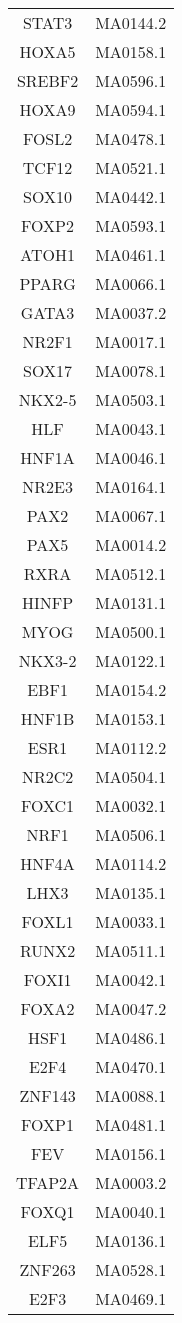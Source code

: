 \begin{supertabular}{cc}
STAT3 & MA0144.2\\
HOXA5 & MA0158.1\\
SREBF2 & MA0596.1\\
HOXA9 & MA0594.1\\
FOSL2 & MA0478.1\\
TCF12 & MA0521.1\\
SOX10 & MA0442.1\\
FOXP2 & MA0593.1\\
ATOH1 & MA0461.1\\
PPARG & MA0066.1\\
GATA3 & MA0037.2\\
NR2F1 & MA0017.1\\
SOX17 & MA0078.1\\
NKX2-5 & MA0503.1\\
HLF & MA0043.1\\
HNF1A & MA0046.1\\
NR2E3 & MA0164.1\\
PAX2 & MA0067.1\\
PAX5 & MA0014.2\\
RXRA & MA0512.1\\
HINFP & MA0131.1\\
MYOG & MA0500.1\\
NKX3-2 & MA0122.1\\
EBF1 & MA0154.2\\
HNF1B & MA0153.1\\
ESR1 & MA0112.2\\
NR2C2 & MA0504.1\\
FOXC1 & MA0032.1\\
NRF1 & MA0506.1\\
HNF4A & MA0114.2\\
LHX3 & MA0135.1\\
FOXL1 & MA0033.1\\
RUNX2 & MA0511.1\\
FOXI1 & MA0042.1\\
FOXA2 & MA0047.2\\
HSF1 & MA0486.1\\
E2F4 & MA0470.1\\
ZNF143 & MA0088.1\\
FOXP1 & MA0481.1\\
FEV & MA0156.1\\
TFAP2A & MA0003.2\\
FOXQ1 & MA0040.1\\
ELF5 & MA0136.1\\
ZNF263 & MA0528.1\\
E2F3 & MA0469.1\\

\end{supertabular}
